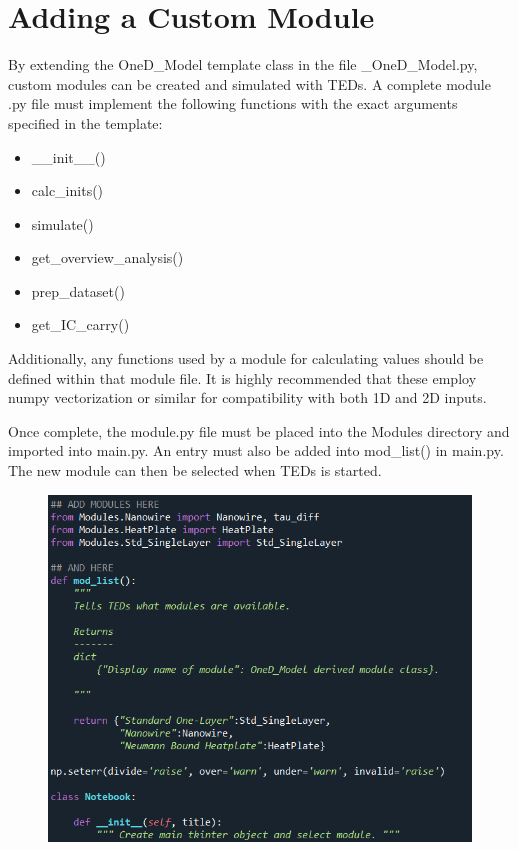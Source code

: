 \documentclass[11pt,letterpaper,titlepage]{article}
\begin{document}
	\newpage
	\section{Adding a Custom Module}
	
		\par By extending the OneD\_Model template class in the file \_OneD\_Model.py, custom modules can be created and simulated with TEDs. A complete module .py file must implement the following functions with the exact arguments specified in the template:
		
		\begin{itemize}
			\item \_\_init\_\_()
			\item calc\_inits()
			\item simulate()
			\item get\_overview\_analysis()
			\item prep\_dataset()
			\item get\_IC\_carry()
		\end{itemize}
	
		\par Additionally, any functions used by a module for calculating values should be defined within that module file. It is highly recommended that these employ numpy vectorization or similar for compatibility with both 1D and 2D inputs.
	
		\par Once complete, the module.py file must be placed into the Modules directory and imported into main.py. An entry must also be added into mod\_list() in main.py. The new module can then be selected when TEDs is started.
		
		\begin{figure}[H]
			\label{fig:modules_here}
			\centering
			\includegraphics[scale=0.9]{"modules_here"}
		\end{figure}
	
\end{document}

